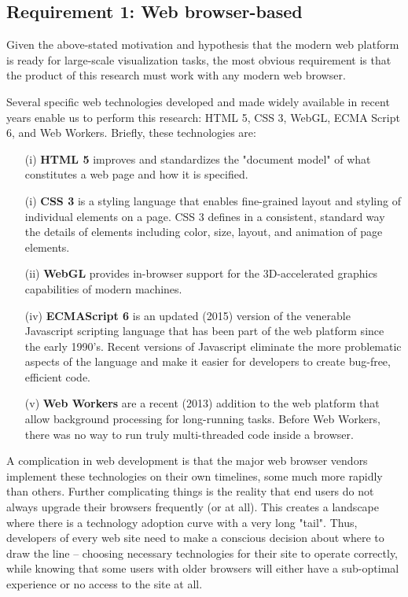 \documentclass[Afour,sagev,times]{sagej}
\begin{document}
\subsection{Requirement 1: Web browser-based}

Given the above-stated motivation and hypothesis that the modern web
platform is ready for large-scale visualization tasks, the most obvious requirement is that the product of this research must work with any modern web browser.

Several specific web technologies developed and made widely available in recent years enable us to perform this research: HTML 5, CSS 3, WebGL, ECMA Script 6, and Web Workers. Briefly, these technologies are:

\begin{enumerate}

\item[(i)] \textbf{HTML 5} improves and standardizes the "document model" of what constitutes a web page and how it is specified.
\item[(i)] \textbf{CSS 3} is a styling language that enables fine-grained layout and styling of individual elements on a page. CSS 3 defines in a consistent, standard way the details of elements including color, size, layout, and animation of page elements.
\item[(ii)] \textbf{WebGL} provides in-browser support for the 3D-accelerated graphics capabilities of modern machines.
\item[(iv)] \textbf{ECMAScript 6} is an updated (2015) version of the venerable Javascript scripting language that has been part of the web platform since the early 1990's. Recent versions of Javascript eliminate the more problematic aspects of the language and make it easier for developers to create bug-free, efficient code.
\item[(v)] \textbf{Web Workers} are a recent (2013) addition to the web platform that allow background processing for long-running tasks. Before Web Workers, there was no way to run truly multi-threaded code inside a browser.

\end{enumerate}

A complication in web development is that the major web browser vendors implement these technologies on their own timelines, some much more rapidly than others. Further complicating things is the reality that end users do not always upgrade their browsers frequently (or at all). This creates a landscape where there is a technology adoption curve with a very long "tail". Thus, developers of every web site need to make a conscious decision about where to
draw the line -- choosing necessary technologies for their site to operate correctly, while knowing that some users with older browsers will either have a sub-optimal experience or no access to the site at all.
\end{document}
